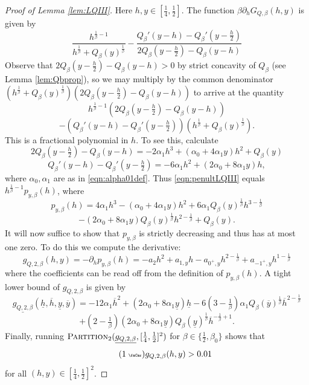 \documentclass[12pt]{amsart}
\theoremstyle{plain}
\newcommand{\auto}{\tag{\addtocounter{equation}{1}\theequation\;{\tiny\faCar}}}
\theoremstyle{definition}
\theoremstyle{remark}
\numberwithin{equation}{section}
\begin{document}
\begin{proof}[Proof of Lemma \ref{lem:LQIII}]
Here $h,y\in [\frac14,\frac12]$.
The function $\beta\partial_h G_{Q,\beta}(h,y)$ is given by
\[ \frac{h^{\frac1\beta-1}}{h^{\frac1\beta}+Q_\beta(y)^{\frac1\beta}} - \frac{Q_\beta'(y-h)-Q_\beta'(y-\frac{h}2)}{2Q_\beta(y-\frac{h}2)-Q_\beta(y-h)} \]
Observe that $2Q_\beta(y-\frac{h}2)-Q_\beta(y-h)>0$ by strict concavity of $Q_\beta$ (see Lemma \ref{lem:Qbprop}), 
so we may multiply by the common denominator $(h^{\frac1\beta}+Q_\beta(y)^{\frac1\beta})(2Q_\beta(y-\frac{h}2)-Q_\beta(y-h))$
to arrive at the quantity
\begin{equation}\label{eqn:penultLQIII} h^{\frac1\beta-1}(2Q_\beta(y-\tfrac{h}2)-Q_\beta(y-h))
\end{equation}
 \[-(Q_\beta'(y-h)-Q_\beta'(y-\tfrac{h}2))(h^{\frac1\beta}+Q_\beta(y)^{\frac1\beta}). \]
This is a fractional polynomial in $h$. To see this, calculate
\[ 2Q_\beta(y-\tfrac{h}2)-Q_\beta(y-h) 
=-2\alpha_1 h^3+(\alpha_0+4\alpha_1 y)h^2 + Q_\beta(y)
\]
\[ Q_\beta'(y-h)-Q_\beta'(y-\tfrac{h}2)=-6\alpha_1 h^2+(2\alpha_0+8\alpha_1 y)h, \]
where $\alpha_0,\alpha_1$ are as in \eqref{eqn:alpha01def}.
Thus \eqref{eqn:penultLQIII} equals
$h^{\frac1\beta-1} p_{y,\beta}(h)$, where
\[ p_{y,\beta}(h) = 4\alpha_1 h^{3} - (\alpha_0 + 4\alpha_1 y)h^{2} + 6\alpha_1 Q_\beta(y)^{\frac1\beta} h^{3-\frac1\beta}\]\[ - (2\alpha_0+8\alpha_1 y)Q_\beta(y)^{\frac1\beta} h^{2-\frac1\beta} + Q_\beta(y).\]
It will now suffice to show that $p_{y,\beta}$ is strictly decreasing and thus has at most one zero.
To do this we compute the derivative:
\[ g_{Q,2,\beta}(h,y) = -\partial_h p_{y,\beta}(h) = -a_2 h^{2} +  a_{1,y} h - a_{0^+,y} h^{2-\frac1\beta} + a_{-1^+,y} h^{1-\frac1\beta}
\]
where the coefficients can be read off from the definition of $p_{y,\beta}(h)$.
A tight lower bound of $g_{Q,2,\beta}$ is given by
\[ \underline{g_{Q,2,\beta}}(\underline{h},\overline{h},\underline{y},\overline{y}) = -12\alpha_1 \overline{h}^{2} + (2\alpha_0 + 8\alpha_1 \underline{y})\underline{h} - 6(3-\tfrac1\beta)\alpha_1 Q_\beta(\overline{y})^{\frac1\beta} \overline{h}^{2-\frac1\beta} \] 
\[ + (2-\tfrac1\beta)(2\alpha_0+8\alpha_1 \underline{y})Q_\beta(\underline{y})^{\frac1\beta} \overline{h}^{-\frac1\beta+1}. \]
Finally, running $\textsc{Partition}_2(\underline{g_{Q,2,\beta}}, [\tfrac14,\tfrac12]^2)$ for $\beta\in\{\frac12,\beta_0\}$ shows that 
\begin{equation}\label{eqn:g_Q_2_auto}\auto
g_{Q,2,\beta}(h,y)>0.01
\end{equation}
for all $(h,y)\in [\tfrac14,\tfrac12]^2$.
\end{proof}
\end{document}
